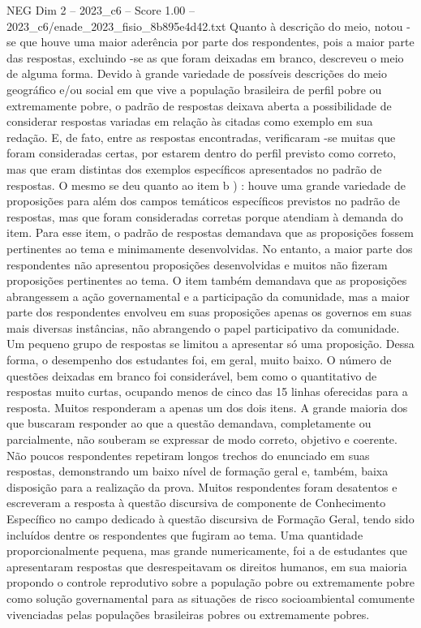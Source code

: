 \begin{textsample}{NEG Dim 2 – 2023\_c6 – Score 1.00 – 2023\_c6/enade\_2023\_fisio\_8b895e4d42.txt}
Quanto à descrição do meio, notou -se que houve uma maior aderência por parte dos respondentes, pois a maior parte das respostas, excluindo -se as que foram deixadas em branco, descreveu o meio de alguma forma.
Devido à grande variedade de possíveis descrições do meio geográfico e/ou social em que vive a população brasileira de perfil pobre ou extremamente pobre, o padrão de respostas deixava aberta a possibilidade de considerar respostas variadas em relação às citadas como exemplo em sua redação.
E, de fato, entre as respostas encontradas, verificaram -se muitas que foram consideradas certas, por estarem dentro do perfil previsto como correto, mas que eram distintas dos exemplos específicos apresentados no padrão de respostas.
O mesmo se deu quanto ao item b ) : houve uma grande variedade de proposições para além dos campos temáticos específicos previstos no padrão de respostas, mas que foram consideradas corretas porque atendiam à demanda do item.
Para esse item, o padrão de respostas demandava que as proposições fossem pertinentes ao tema e minimamente desenvolvidas.
No entanto, a maior parte dos respondentes não apresentou proposições desenvolvidas e muitos não fizeram proposições pertinentes ao tema.
O item também demandava que as proposições abrangessem a ação governamental e a participação da comunidade, mas a maior parte dos respondentes envolveu em suas proposições apenas os governos em suas mais diversas instâncias, não abrangendo o papel participativo da comunidade.
Um pequeno grupo de respostas se limitou a apresentar só uma proposição.
Dessa forma, o desempenho dos estudantes foi, em geral, muito baixo.
O número de questões deixadas em branco foi considerável, bem como o quantitativo de respostas muito curtas, ocupando menos de cinco das 15 linhas oferecidas para a resposta.
Muitos responderam a apenas um dos dois itens.
A grande maioria dos que buscaram responder ao que a questão demandava, completamente ou parcialmente, não souberam se expressar de modo correto, objetivo e coerente.
Não poucos respondentes repetiram longos trechos do enunciado em suas respostas, demonstrando um baixo nível de formação geral e, também, baixa disposição para a realização da prova.
Muitos respondentes foram desatentos e escreveram a resposta à questão discursiva de componente de Conhecimento Específico no campo dedicado à questão discursiva de Formação Geral, tendo sido incluídos dentre os respondentes que fugiram ao tema.
Uma quantidade proporcionalmente pequena, mas grande numericamente, foi a de estudantes que apresentaram respostas que desrespeitavam os direitos humanos, em sua maioria propondo o controle reprodutivo sobre a população pobre ou extremamente pobre como solução governamental para as situações de risco socioambiental comumente vivenciadas pelas populações brasileiras pobres ou extremamente pobres.

\end{textsample}
